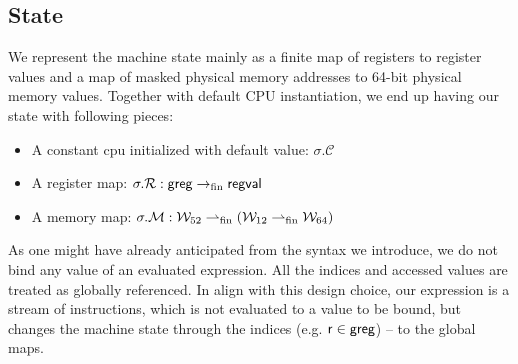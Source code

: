 \subsection{State}
\label{sec:state}
We represent the machine state mainly as a finite map of registers to register values and a map of masked physical memory addresses to 64-bit physical memory values. Together with default \textsf{CPU} instantiation, we end up having our state with following pieces:
\begin{itemize}
\item A constant cpu initialized with default value: $\sigma.\mathcal{C}$
\item A register map: $\sigma.\mathcal{R}: \mathsf{greg} \rightarrow_{\textrm{fin}} \mathsf{regval} $
\item A memory map: $\sigma.\mathcal{M}: \mathcal{W}_{52} \rightharpoonup_{\textrm{fin}} (\mathcal{W}_{12} \rightharpoonup_{\textrm{fin}} \mathcal{W}_{64} )$
\end{itemize}
As one might have already anticipated from the syntax we introduce, we do not bind any value of an evaluated expression. All the indices and accessed values are treated as globally referenced. In align with this design choice, our expression is a stream of instructions, which is not evaluated to a value to be bound, but changes the machine state through the indices (e.g. $\mathsf{r}\in\mathsf{greg}$) -- to the global maps.
